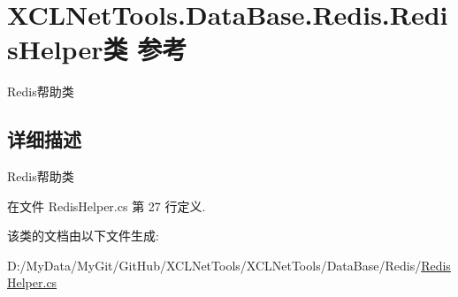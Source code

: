 \hypertarget{class_x_c_l_net_tools_1_1_data_base_1_1_redis_1_1_redis_helper}{\section{X\-C\-L\-Net\-Tools.\-Data\-Base.\-Redis.\-Redis\-Helper类 参考}
\label{class_x_c_l_net_tools_1_1_data_base_1_1_redis_1_1_redis_helper}
}


Redis帮助类  




\subsection{详细描述}
Redis帮助类 



在文件 Redis\-Helper.\-cs 第 27 行定义.



该类的文档由以下文件生成\-:\begin{DoxyCompactItemize}
\item 
D\-:/\-My\-Data/\-My\-Git/\-Git\-Hub/\-X\-C\-L\-Net\-Tools/\-X\-C\-L\-Net\-Tools/\-Data\-Base/\-Redis/\hyperlink{_redis_helper_8cs}{Redis\-Helper.\-cs}\end{DoxyCompactItemize}
